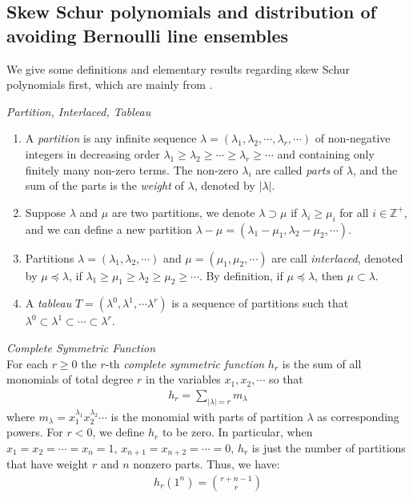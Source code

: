\subsection{Skew Schur polynomials and distribution of avoiding Bernoulli line ensembles}{\label{SkewSchurPoly}}
We give some definitions and elementary results regarding skew Schur polynomials first, which are mainly from \cite[Chapter 1]{Mac}.
\begin{definition}{\label{DefPar}} \emph{Partition, Interlaced, Tableau}
\begin{enumerate}
	\item A \emph{partition} is any infinite sequence $\lambda=(\lambda_{1}, \lambda_{2}, \cdots, \lambda_{r}, \cdots)$ of non-negative integers in decreasing order $\lambda_{1}\geq \lambda_{2}\geq \cdots\geq \lambda_{r}\geq \cdots$ and containing only finitely many non-zero terms. The non-zero $\lambda_{i}$ are called \emph{parts} of $\lambda$, and the sum of the parts is the \emph{weight} of $\lambda$, denoted by $|\lambda|$.
	\item Suppose $\lambda$ and $\mu$ are two partitions, we denote $\lambda\supset\mu$ if $\lambda_{i}\geq \mu_{i}$ for all $i\in \mathbb{Z}^{+}$, and we can define a new partition $\lambda-\mu=(\lambda_{1}-\mu_{1},\lambda_{2}-\mu_{2},\cdots)$.
	\item Partitions $\lambda=(\lambda_{1}, \lambda_{2},\cdots)$ and $\mu=(\mu_{1}, \mu_{2},\cdots)$ are call \emph{interlaced}, denoted by $\mu\preceq \lambda$, if $\lambda_1\geq \mu_1\geq \lambda_2\geq \mu_2\geq\cdots$. By definition, if $\mu\preceq\lambda$, then $\mu\subset\lambda$.
	\item A \emph{tableau} $T=(\lambda^{0}, \lambda^{1}, \cdots \lambda^{r})$ is a sequence of partitions such that $\lambda^{0}\subset\lambda^{1}\subset \cdots\subset \lambda^{r}$.
\end{enumerate}
\end{definition}

\begin{definition} \emph{Complete Symmetric Function}{\label{CompSymFunc}}\\
	For each $r\geq 0$ the $r$-th \emph{complete symmetric function} $h_{r}$ is the sum of all monomials of total degree $r$ in the variables $x_1, x_2, \cdots$ so that
	\begin{align}
		h_{r}=\sum_{|\lambda|=r}m_{\lambda}
	\end{align}
	 where $m_{\lambda}=x_1^{\lambda_1}x_2^{\lambda_2}\cdots$ is the monomial with parts of partition $\lambda$ as corresponding powers. For $r<0$, we  define $h_r$ to be zero. In particular, when $x_1=x_2=\cdots=x_n=1$, $x_{n+1}=x_{n+2}=\cdots=0$, $h_r$ is just the number of partitions that have weight $r$ and $n$ nonzero parts. Thus, we have: 
	 \begin{align}
	 	h_{r}(1^{n})=\binom{r+n-1}{r}
	 \end{align}
\end{definition}

